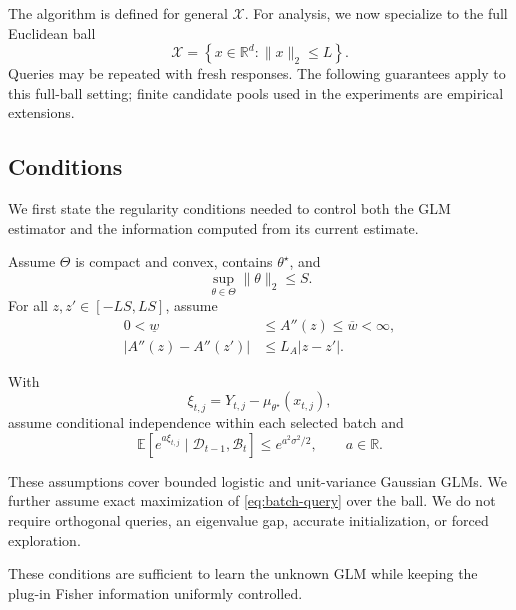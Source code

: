 \documentclass[10pt,twoside,letterpaper]{article}
\newcommand{\R}{\mathbb R}
\newcommand{\E}{\mathbb E}
\newcommand{\norm}[1]{\lVert #1\rVert}
\begin{document}
The algorithm is defined for general $\mathcal X$. For analysis, we now
specialize to the full Euclidean ball
\begin{equation}
\mathcal X
=
\left\{
x\in\R^d:
\norm{x}_2\le L
\right\}.
\label{eq:theory-ball}
\end{equation}
Queries may be repeated with fresh responses. The following guarantees
apply to this full-ball setting; finite candidate pools used in the
experiments are empirical extensions.


\subsection{Conditions}
\label{sec:conditions}

We first state the regularity conditions needed to control both the GLM
estimator and the information computed from its current estimate.

Assume $\Theta$ is compact and convex, contains $\theta^\star$, and
\begin{equation}
\sup_{\theta\in\Theta}
\norm{\theta}_2
\le
S.
\end{equation}
For all $z,z'\in[-LS,LS]$, assume
\begin{equation}
\begin{aligned}
0<\underline w
&\le
A''(z)
\le
\overline w<\infty,\\
|A''(z)-A''(z')|
&\le
L_A|z-z'|.
\end{aligned}
\label{eq:regularity}
\end{equation}

With
\begin{equation}
\xi_{t,j}
=
Y_{t,j}
-
\mu_{\theta^\star}(x_{t,j}),
\end{equation}
assume conditional independence within each selected batch and
\begin{equation}
\E
\left[
e^{a\xi_{t,j}}
\mid
\mathcal D_{t-1},\mathcal B_t
\right]
\le
e^{a^2\sigma^2/2},
\qquad
a\in\R.
\label{eq:noise-condition}
\end{equation}

These assumptions cover bounded logistic and unit-variance Gaussian
GLMs. We further assume exact maximization of
\eqref{eq:batch-query} over the ball. We do not require orthogonal
queries, an eigenvalue gap, accurate initialization, or forced
exploration.

These conditions are sufficient to learn the unknown GLM while keeping
the plug-in Fisher information uniformly controlled.
\end{document}
